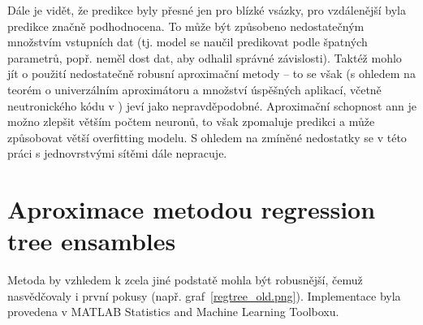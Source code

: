 Dále je vidět, že predikce byly přesné jen pro blízké vsázky, pro vzdálenější byla predikce značně podhodnocena. To může být způsobeno nedostatečným 
množstvím vstupních dat (tj. model se naučil predikovat podle špatných parametrů, popř. neměl dost dat, aby odhalil správné závislosti). Taktéž mohlo jít 
o použití nedostatečně robusní aproximační metody -- to se však (s ohledem na teorém o univerzálním aproximátoru \cite{hornik} a množství úspěšných aplikací, 
včetně neutronického kódu v \cite{schlunz, erdogan, jiang}) jeví jako nepravděpodobné. Aproximační schopnost \ac{ann} je možno zlepšit větším počtem 
neuronů, to však zpomaluje predikci a může způsobovat větší overfitting modelu. S ohledem na zmíněné nedostatky se v této práci s jednovrstvými sítěmi 
dále nepracuje. 

\section{Aproximace metodou regression tree ensambles}
Metoda by vzhledem k zcela jiné podstatě mohla být robusnější, čemuž nasvědčovaly i první pokusy (např. graf~\ref{regtree_old.png}). 
Implementace byla provedena v MATLAB Statistics and Machine Learning Toolboxu. 

